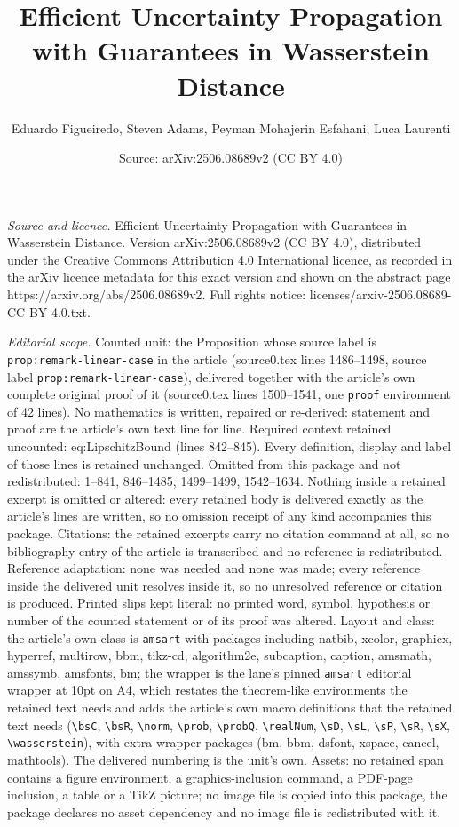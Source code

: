 \documentclass[10pt,a4paper]{amsart}
\title[Efficient Uncertainty Propagation with Guarantees in Wassers]{Efficient Uncertainty Propagation with Guarantees in Wasserstein Distance}
\author{Eduardo Figueiredo, Steven Adams, Peyman Mohajerin Esfahani, Luca Laurenti}
\date{Source: arXiv:2506.08689v2 (CC BY 4.0)}
\begin{document}
\maketitle

\noindent\emph{Source and licence.} Efficient Uncertainty Propagation with Guarantees in Wasserstein Distance. Version arXiv:2506.08689v2 (CC BY 4.0), distributed under the Creative Commons Attribution 4.0 International licence, as recorded in the arXiv licence metadata for this exact version and shown on the abstract page https://arxiv.org/abs/2506.08689v2. Full rights notice: licenses/arxiv-2506.08689-CC-BY-4.0.txt.\par\smallskip

\noindent\textit{Editorial scope.} Counted unit: the Proposition whose source label is \texttt{prop:remark-linear-case} in the article (source0.tex lines 1486--1498, source label \texttt{prop:remark-linear-case}), delivered together with the article's own complete original proof of it (source0.tex lines 1500--1541, one \texttt{proof} environment of 42 lines). No mathematics is written, repaired or re-derived: statement and proof are the article's own text line for line. Required context retained uncounted: eq:LipschitzBound (lines 842--845). Every definition, display and label of those lines is retained unchanged. Omitted from this package and not redistributed: 1--841, 846--1485, 1499--1499, 1542--1634. Nothing inside a retained excerpt is omitted or altered: every retained body is delivered exactly as the article's lines are written, so no omission receipt of any kind accompanies this package. Citations: the retained excerpts carry no citation command at all, so no bibliography entry of the article is transcribed and no reference is redistributed. Reference adaptation: none was needed and none was made; every reference inside the delivered unit resolves inside it, so no unresolved reference or citation is produced. Printed slips kept literal: no printed word, symbol, hypothesis or number of the counted statement or of its proof was altered. Layout and class: the article's own class is \texttt{amsart} with packages including natbib, xcolor, graphicx, hyperref, multirow, bbm, tikz-cd, algorithm2e, subcaption, caption, amsmath, amssymb, amsfonts, bm; the wrapper is the lane's pinned \texttt{amsart} editorial wrapper at 10pt on A4, which restates the theorem-like environments the retained text needs and adds the article's own macro definitions that the retained text needs (\texttt{\textbackslash bsC}, \texttt{\textbackslash bsR}, \texttt{\textbackslash norm}, \texttt{\textbackslash prob}, \texttt{\textbackslash probQ}, \texttt{\textbackslash realNum}, \texttt{\textbackslash sD}, \texttt{\textbackslash sL}, \texttt{\textbackslash sP}, \texttt{\textbackslash sR}, \texttt{\textbackslash sX}, \texttt{\textbackslash wasserstein}), with extra wrapper packages (bm, bbm, dsfont, xspace, cancel, mathtools). The delivered numbering is the unit's own. Assets: no retained span contains a figure environment, a graphics-inclusion command, a PDF-page inclusion, a table or a TikZ picture; no image file is copied into this package, the package declares no asset dependency and no image file is redistributed with it. 
\end{document}
